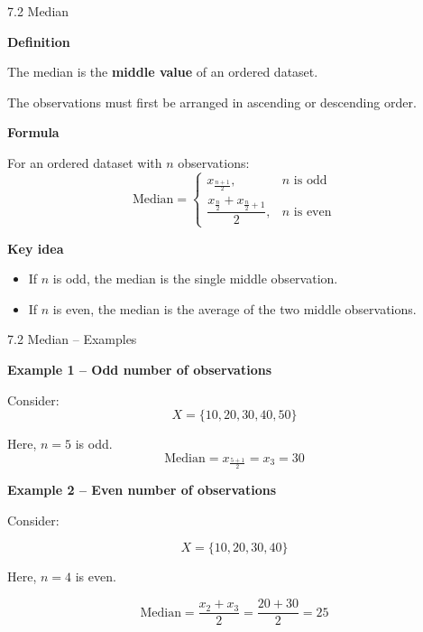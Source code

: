 \begin{frame}{7.2 Median}

\textbf{Definition}

The median is the \textbf{middle value} of an ordered dataset.

The observations must first be arranged in ascending or
descending order.

\textbf{Formula}

For an ordered dataset with $n$ observations:
\[
\boxed{
\text{Median} =
\begin{cases}
x_{\frac{n+1}{2}}, & n \text{ is odd}\\[8pt]
\dfrac{x_{\frac{n}{2}}+x_{\frac{n}{2}+1}}{2},
& n \text{ is even}
\end{cases}
}
\]

\textbf{Key idea}

\begin{itemize}
    \item If $n$ is odd, the median is the single middle observation.
    \item If $n$ is even, the median is the average of the two middle observations.
\end{itemize}

\end{frame}



\begin{frame}{7.2 Median -- Examples}

\textbf{Example 1 -- Odd number of observations}

Consider:
\[
X=\{10,20,30,40,50\}
\]

Here, $n=5$ is odd.
\[
\text{Median}
=
x_{\frac{5+1}{2}}
=
x_3
=
\boxed{30}
\]

\vspace{0.1cm}

\textbf{Example 2 -- Even number of observations}

Consider:

\[
X=\{10,20,30,40\}
\]

Here, $n=4$ is even.

\[
\text{Median}
=
\frac{x_2+x_3}{2}
=
\frac{20+30}{2}
=
\boxed{25}
\]

\end{frame}



